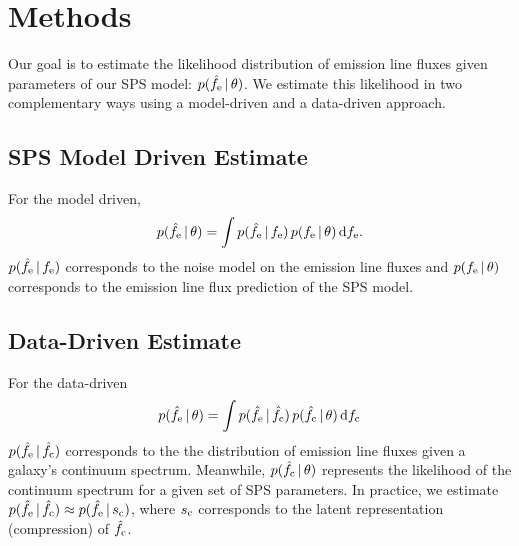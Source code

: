 \section{Methods}\label{sec:methods}
Our goal is to estimate the likelihood distribution of emission line fluxes given
parameters of our SPS model: $p(\hat{f}_{\rm e} \,|\, \theta)$. 
We estimate this likelihood in two complementary ways using a model-driven and
a data-driven approach.


\subsection{SPS Model Driven Estimate}\label{sec:model}
For the model driven, 
\begin{equation}\label{eq:model_driven}
    p(\hat{f}_{\rm e} \given \theta) = \int p(\hat{f}_{\rm e}\given f_{\rm
    e})\,p(f_{\rm e}\given \theta)\,{\rm d}f_{\rm e}.
\end{equation} 
$p(\hat{f}_{\rm e}\,|\, f_{\rm e})$ corresponds to the noise model on the
emission line fluxes and $p(f_{\rm e}\,|\, \theta)$ corresponds to the
emission line flux prediction of the SPS model. 


\subsection{Data-Driven Estimate}\label{sec:model}
For the data-driven 
\begin{equation}\label{eq:data_driven}
    p(\hat{f}_{\rm e} \given \theta) = \int p(\hat{f}_{\rm e}\given \hat{f}_{\rm
    c})\,p(\hat{f}_{\rm c}\given \theta)\,{\rm d}f_{\rm c} 
\end{equation} 
$p(\hat{f}_{\rm e}\,|\, \hat{f}_{\rm c})$ corresponds to the the distribution
of emission line fluxes given a galaxy's continuum spectrum. 
Meanwhile, $p(\hat{f}_{\rm c}\,|\, \theta)$ represents the likelihood of the
continuum spectrum for a given set of SPS parameters. 
In practice, we estimate $p(\hat{f}_{\rm e}\,|\, \hat{f}_{\rm c}) \approx
p(\hat{f}_{\rm e}\,|\, s_{\rm c})$, where $s_{\rm c}$ corresponds to the
latent representation (compression) of $\hat{f}_{\rm c}$.  

